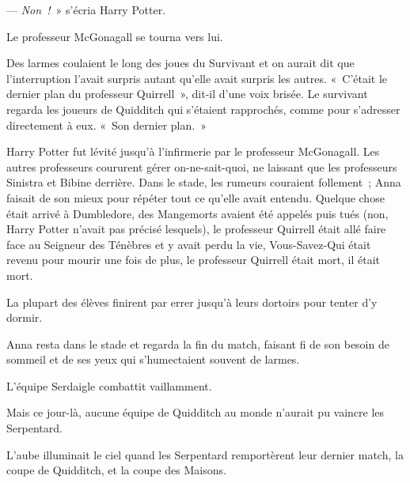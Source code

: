 --- \emph{Non~!}~» s'écria Harry Potter.

Le professeur McGonagall se tourna vers lui.

Des larmes coulaient le long des joues du Survivant et on aurait dit que l'interruption l'avait surpris autant qu'elle avait surpris les autres. «~C'était le dernier plan du professeur Quirrell~», dit-il d'une voix brisée. Le survivant regarda les joueurs de Quidditch qui s'étaient rapprochés, comme pour s'adresser directement à eux. «~Son dernier plan.~»

Harry Potter fut lévité jusqu'à l'infirmerie par le professeur McGonagall. Les autres professeurs coururent gérer on-ne-sait-quoi, ne laissant que les professeurs Sinistra et Bibine derrière. Dans le stade, les rumeurs couraient follement~; Anna faisait de son mieux pour répéter tout ce qu'elle avait entendu. Quelque chose était arrivé à Dumbledore, des Mangemorts avaient été appelés puis tués (non, Harry Potter n'avait pas précisé lesquels), le professeur Quirrell était allé faire face au Seigneur des Ténèbres et y avait perdu la vie, Vous-Savez-Qui était revenu pour mourir une fois de plus, le professeur Quirrell était mort, il était mort.

La plupart des élèves finirent par errer jusqu'à leurs dortoirs pour tenter d'y dormir.

Anna resta dans le stade et regarda la fin du match, faisant fi de son besoin de sommeil et de ses yeux qui s'humectaient souvent de larmes.

L'équipe Serdaigle combattit vaillamment.

Mais ce jour-là, aucune équipe de Quidditch au monde n'aurait pu vaincre les Serpentard.

L'aube illuminait le ciel quand les Serpentard remportèrent leur dernier match, la coupe de Quidditch, et la coupe des Maisons.
